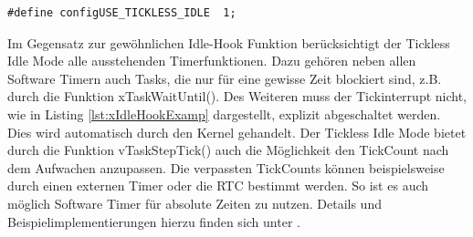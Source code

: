 \begin{lstlisting}[label=lst:defineTicklessIdle, numbers = none]
#define configUSE_TICKLESS_IDLE  1; 
\end{lstlisting}
Im Gegensatz zur gewöhnlichen Idle-Hook Funktion be\-rück\-sich\-tigt der Tickless Idle Mode alle ausstehenden Timerfunktionen. Dazu gehören neben allen Software Timern auch Tasks, die nur für eine gewisse Zeit blockiert sind, z.B. durch die Funktion xTaskWaitUntil(). Des Weiteren muss der Tickinterrupt nicht, wie in Listing \ref{lst:xIdleHookExamp} dargestellt, explizit abgeschaltet werden. Dies wird automatisch durch den Kernel gehandelt. Der Tickless Idle Mode bietet durch die Funktion vTaskStepTick() auch die Möglichkeit den TickCount nach dem Aufwachen anzupassen. Die verpassten TickCounts können beispielsweise durch einen externen Timer oder die RTC bestimmt werden. So ist es auch möglich Software Timer für absolute Zeiten zu nutzen. Details und Beispielimplementierungen hierzu finden sich unter \cite{FreeRtosAdvanced}.  

